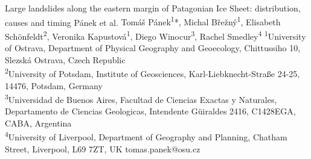 \abstract
{Large landslides along the eastern margin of Patagonian Ice Sheet: distribution, causes and timing} %
{Pánek et al.} %
{Tomáš Pánek\textsuperscript{1}*, Michal Břežný\textsuperscript{1}, Elisabeth Schönfeldt\textsuperscript{2}, Veronika Kapustová\textsuperscript{1}, Diego Winocur\textsuperscript{3}, Rachel Smedley\textsuperscript{4}} %
{\KLtag} %
{\textsuperscript{1}University of Ostrava, Department of Physical Geography and Geoecology, Chittussiho 10, Slezská Ostrava, Czech Republic \\
\textsuperscript{2}University of Potsdam, Institute of Geosciences, Karl-Liebknecht-Straße 24-25, 14476, Potsdam, Germany \\
\textsuperscript{3}Universidad de Buenos Aires, Facultad de Ciencias Exactas y Naturales, Departamento de Ciencias Geologicas, Intendente Güiraldes 2416, C1428EGA, CABA, Argentina \\
\textsuperscript{4}University of Liverpool, Department of Geography and Planning, Chatham Street, Liverpool, L69 7ZT, UK} %
{tomas.panek@osu.cz}  %
{}%
